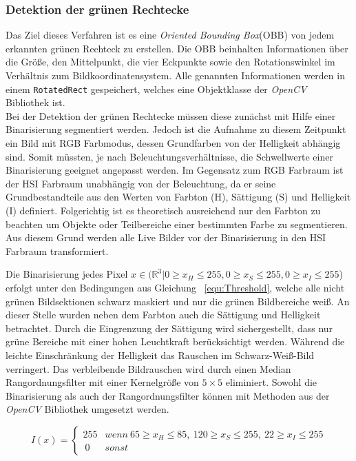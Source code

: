 \subsubsection{Detektion der grünen Rechtecke}\label{sec:GreenRects}
Das Ziel dieses Verfahren ist es eine \textit{Oriented Bounding Box}(OBB) von jedem erkannten grünen Rechteck zu erstellen. Die OBB beinhalten Informationen über die Größe, den Mittelpunkt, die vier Eckpunkte sowie den Rotationswinkel im Verhältnis zum Bildkoordinatensystem. Alle genannten Informationen werden in einem \texttt{Rotated\-Rect} gespeichert, welches eine Objektklasse der \textit{OpenCV} Bibliothek ist.\\
Bei der Detektion der grünen Rechtecke müssen diese zunächst mit Hilfe einer Binarisierung segmentiert werden. Jedoch ist die Aufnahme zu diesem Zeitpunkt ein Bild mit RGB Farbmodus, dessen Grundfarben von der Helligkeit abhängig sind. Somit müssten, je nach Beleuchtungsverhältnisse, die Schwellwerte einer Binarisierung geeignet angepasst werden. Im Gegensatz zum RGB Farbraum ist der HSI Farbraum unabhängig von der Beleuchtung, da er seine Grundbestandteile aus den Werten von Farbton (H), Sättigung (S) und Helligkeit (I) definiert. Folgerichtig ist es theoretisch ausreichend nur den Farbton zu beachten um Objekte oder Teilbereiche einer bestimmten Farbe zu segmentieren. Aus diesem Grund werden alle Live Bilder vor der Binarisierung in den HSI Farbraum transformiert.

Die Binarisierung jedes Pixel $x \in (\mathbb{R}^{3} | 0 \ge x_H \le 255, 0 \ge x_S \le 255, 0 \ge x_I \le 255$) erfolgt unter den Bedingungen aus Gleichung ~\ref{equ:Threshold}, welche alle nicht grünen Bildsektionen schwarz maskiert und nur die grünen Bildbereiche weiß. An dieser Stelle wurden neben dem Farbton auch die Sättigung und Helligkeit betrachtet. Durch die Eingrenzung der Sättigung wird sichergestellt, dass nur grüne Bereiche mit einer hohen Leuchtkraft berücksichtigt werden. Während die leichte Einschränkung der Helligkeit das Rauschen im Schwarz-Weiß-Bild verringert. Das verbleibende Bildrauschen wird durch einen Median Rangordnungsfilter mit einer Kernelgröße von $5\times5$ eliminiert. Sowohl die Binarisierung als auch der Rangordnungsfilter können mit Methoden aus der \textit{OpenCV} Bibliothek umgesetzt werden.

\begin{equation}
\label{equ:Threshold}
I(x) = \begin{cases}
255 & wenn \ 65 \ge x_H \le 85, \ 120 \ge x_S \le 255, \ 22 \ge x_I \le 255\\\
0 & sonst
\end{cases}
\end{equation}

